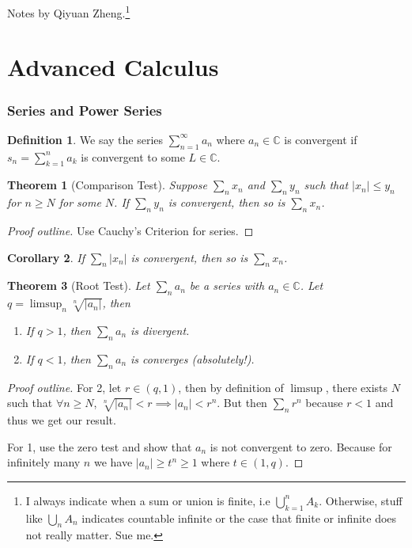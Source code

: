 \documentclass[letterpaper,12pt]{article}
\theoremstyle{definition}
\newtheorem{definition}{Definition}[section]
\theoremstyle{plain}
\newtheorem{thm}{Theorem}[section]
\newtheorem{corollary}[thm]{Corollary}
\theoremstyle{remark}
\begin{document}
Notes by Qiyuan Zheng.\footnote{I always indicate when a sum or union is finite, i.e $\bigcup_{k=1}^n A_k$. Otherwise, stuff like $\bigcup_n A_n$ indicates countable infinite or the case that finite or infinite does not really matter. Sue me.}

\part{Advanced Calculus}

\section{Series and Power Series}
\begin{definition}
We say the series $\sum_{n=1}^\infty a_n$ where $a_n\in \mathbb{C}$ is convergent if $s_n = \sum_{k=1}^n a_k$ is convergent to some $L \in \mathbb{C}$.
\end{definition}

\begin{thm}[Comparison Test]
Suppose $\sum_n x_n$ and $\sum_n y_n$ such that $|x_n|\leq y_n$ for $n\geq N$ for some $N$. If $\sum_n y_n$ is convergent, then so is $\sum_n x_n$.
\end{thm}

\begin{proof}[Proof outline]
Use Cauchy's Criterion for series.
\end{proof}

\begin{corollary}
If $\sum_n |x_n|$ is convergent, then so is $\sum_n x_n$.
\end{corollary}

\begin{thm}[Root Test]
Let $\sum_n a_n$ be a series with $a_n\in \mathbb{C}$. Let $q = \limsup_n \sqrt[n]{|a_n|}$, then
\begin{enumerate}
  \item If $q>1$, then $\sum_n a_n$ is divergent.
  \item If $q<1$, then $\sum_n a_n$ is converges (absolutely!).
\end{enumerate}
\end{thm}

\begin{proof}[Proof outline]
For 2, let $r\in(q,1)$, then by definition of $\limsup$, there exists $N$ such that $\forall n\geq N$, $\sqrt[n]{|a_n|}<r \implies |a_n|<r^n$. But then $\sum_n r^n$ because $r<1$ and thus we get our result.

For 1, use the zero test and show that $a_n$ is not convergent to zero. Because for infinitely many $n$ we have $|a_n|\geq t^n\geq 1$ where $t\in(1,q)$.
\end{proof}
\end{document}
